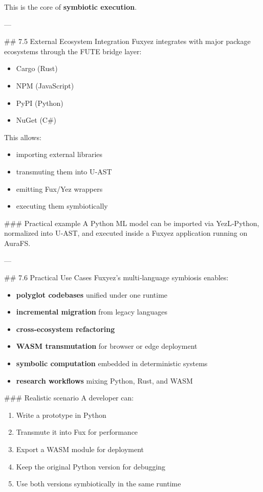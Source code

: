 \documentclass[12pt, a4paper]{book}
\begin{document}
This is the core of \textbf{symbiotic execution}.

---

\#\# 7.5 External Ecosystem Integration  
Fuxyez integrates with major package ecosystems through the FUTE bridge layer:

\begin{itemize}
  \item Cargo (Rust)  
  \item NPM (JavaScript)  
  \item PyPI (Python)  
  \item NuGet (C\#)  
\end{itemize}

This allows:

\begin{itemize}
  \item importing external libraries  
  \item transmuting them into U‑AST  
  \item emitting Fux/Yez wrappers  
  \item executing them symbiotically  
\end{itemize}

\#\#\# Practical example  
A Python ML model can be imported via YezL‑Python, normalized into U‑AST, and executed inside a Fuxyez application running on AuraFS.

---

\#\# 7.6 Practical Use Cases  
Fuxyez’s multi‑language symbiosis enables:

\begin{itemize}
  \item \textbf{polyglot codebases} unified under one runtime  
  \item \textbf{incremental migration} from legacy languages  
  \item \textbf{cross‑ecosystem refactoring}  
  \item \textbf{WASM transmutation} for browser or edge deployment  
  \item \textbf{symbolic computation} embedded in deterministic systems  
  \item \textbf{research workflows} mixing Python, Rust, and WASM  
\end{itemize}

\#\#\# Realistic scenario  
A developer can:

\begin{enumerate}
  \item Write a prototype in Python  
  \item Transmute it into Fux for performance  
  \item Export a WASM module for deployment  
  \item Keep the original Python version for debugging  
  \item Use both versions symbiotically in the same runtime  
\end{enumerate}
\end{document}
